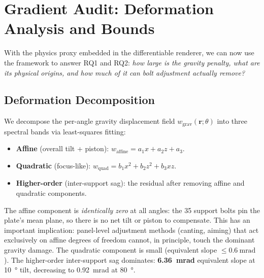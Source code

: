 \documentclass{CVM}
\begin{document}
\section{Gradient Audit: Deformation Analysis and Bounds}
\label{sec:audit}

With the physics proxy embedded in the differentiable renderer, we can now use
the framework to answer RQ1 and RQ2: \emph{how large is the gravity penalty,
what are its physical origins, and how much of it can bolt adjustment actually
remove?}

\subsection{Deformation Decomposition}

We decompose the per-angle gravity displacement field $w_{\text{grav}}(\mathbf{r}; \theta)$
into three spectral bands via least-squares fitting:

\begin{itemize}
  \item \textbf{Affine} (overall tilt + piston): $w_{\text{affine}} = a_1 x + a_2 z + a_3$.
  \item \textbf{Quadratic} (focus-like): $w_{\text{quad}} = b_1 x^2 + b_2 z^2 + b_3 xz$.
  \item \textbf{Higher-order} (inter-support sag): the residual after removing affine
  and quadratic components.
\end{itemize}

The affine component is \emph{identically zero} at all angles: the 35 support
bolts pin the plate's mean plane, so there is no net tilt or piston to
compensate. This has an important implication: panel-level adjustment methods
(canting, aiming) that act exclusively on affine degrees of freedom cannot,
in principle, touch the dominant gravity damage. The quadratic component is
small (equivalent slope $\le \SI{0.6}{\milli\radian}$). The higher-order
inter-support sag dominates: \textbf{\SI{6.36}{\milli\radian}} equivalent
slope at \SI{10}{\degree} tilt, decreasing to \SI{0.92}{\milli\radian} at
\SI{80}{\degree}.

\end{document}
